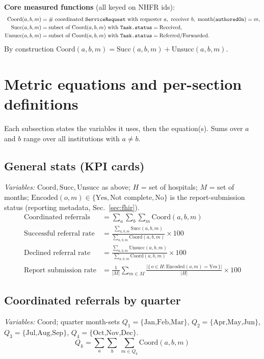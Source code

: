 \documentclass[11pt]{article}
\newcommand{\Coord}{\mathrm{Coord}}
\newcommand{\Succ}{\mathrm{Succ}}
\newcommand{\Unsucc}{\mathrm{Unsucc}}
\newcommand{\Encoded}{\mathrm{Encoded}}
\newcommand{\fhir}[1]{\texttt{#1}}
\begin{document}
\noindent\textbf{Core measured functions} (all keyed on NHFR ids):
\begin{align*}
\Coord(a,b,m)  &= \text{\# coordinated \fhir{ServiceRequest} with requester }a,\ \text{receiver }b,\ \text{month}(\fhir{authoredOn})=m,\\
\Succ(a,b,m)   &= \text{subset of }\Coord(a,b,m)\text{ with }\fhir{Task.status}=\text{Received},\\
\Unsucc(a,b,m) &= \text{subset of }\Coord(a,b,m)\text{ with }\fhir{Task.status}=\text{Referred/Forwarded}.
\end{align*}
By construction $\Coord(a,b,m) = \Succ(a,b,m) + \Unsucc(a,b,m)$.

\section{Metric equations and per-section definitions}\label{sec:metrics}
Each subsection states the variables it uses, then the equation(s). Sums over $a$ and $b$ range over all institutions with $a\neq b$.

\subsection{General stats (KPI cards)}\label{sec:general}
\textit{Variables:} $\Coord,\Succ,\Unsucc$ as above; $H$ = set of hospitals; $M$ = set of months; $\Encoded(o,m)\in\{\text{Yes},\text{Not complete},\text{No}\}$ is the report-submission status (reporting metadata, Sec.~\ref{sec:fhir}).
\begin{align}
\text{Coordinated referrals} &= \sum_{a}\sum_{b}\sum_{m} \Coord(a,b,m) \label{eq:coord}\\[2pt]
\text{Successful referral rate} &= \frac{\displaystyle\sum_{a,b,m}\Succ(a,b,m)}{\displaystyle\sum_{a,b,m}\Coord(a,b,m)}\times 100 \label{eq:succ}\\[2pt]
\text{Declined referral rate} &= \frac{\displaystyle\sum_{a,b,m}\Unsucc(a,b,m)}{\displaystyle\sum_{a,b,m}\Coord(a,b,m)}\times 100 \label{eq:decl}\\[2pt]
\text{Report submission rate} &= \frac{1}{|M|}\sum_{m\in M}\frac{\bigl|\{\,o\in H : \Encoded(o,m)=\text{Yes}\,\}\bigr|}{|H|}\times 100 \label{eq:sub}
\end{align}

\subsection{Coordinated referrals by quarter}\label{sec:quarter}
\textit{Variables:} $\Coord$; quarter month-sets $Q_1=\{\text{Jan,Feb,Mar}\}$, $Q_2=\{\text{Apr,May,Jun}\}$, $Q_3=\{\text{Jul,Aug,Sep}\}$, $Q_4=\{\text{Oct,Nov,Dec}\}$.
\begin{equation}
Q_k = \sum_{a}\sum_{b}\ \sum_{m\in Q_k} \Coord(a,b,m) \label{eq:quarter}
\end{equation}
\end{document}
